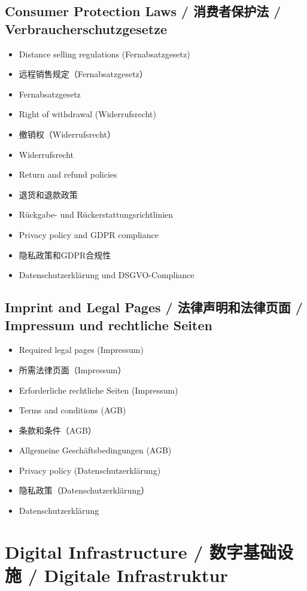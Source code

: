 \subsection{Consumer Protection Laws / 消费者保护法 / Verbraucherschutzgesetze}
\begin{itemize}
    \item Distance selling regulations (Fernabsatzgesetz)
    \item 远程销售规定（Fernabsatzgesetz）
    \item Fernabsatzgesetz
    \item Right of withdrawal (Widerrufsrecht)
    \item 撤销权（Widerrufsrecht）
    \item Widerrufsrecht
    \item Return and refund policies
    \item 退货和退款政策
    \item Rückgabe- und Rückerstattungsrichtlinien
    \item Privacy policy and GDPR compliance
    \item 隐私政策和GDPR合规性
    \item Datenschutzerklärung und DSGVO-Compliance
\end{itemize}

\subsection{Imprint and Legal Pages / 法律声明和法律页面 / Impressum und rechtliche Seiten}
\begin{itemize}
    \item Required legal pages (Impressum)
    \item 所需法律页面（Impressum）
    \item Erforderliche rechtliche Seiten (Impressum)
    \item Terms and conditions (AGB)
    \item 条款和条件（AGB）
    \item Allgemeine Geschäftsbedingungen (AGB)
    \item Privacy policy (Datenschutzerklärung)
    \item 隐私政策（Datenschutzerklärung）
    \item Datenschutzerklärung
\end{itemize}

\section{Digital Infrastructure / 数字基础设施 / Digitale Infrastruktur}

